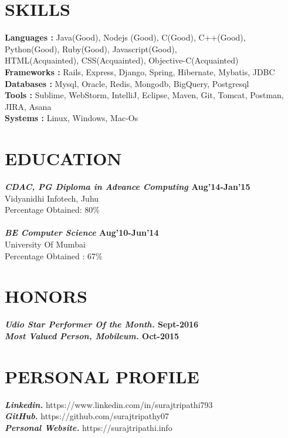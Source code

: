 \documentclass[line, margin]{res}
\begin{document}
\begin{resume}
\section{SKILLS} 
\textbf{Languages : }Java(Good), Nodejs (Good), C(Good), C++(Good), Python(Good), Ruby(Good), Javascript(Good), \\HTML(Acquainted), CSS(Acquainted), Objective-C(Acquainted) \\
\textbf{Frameworks : }Rails, Express, Django, Spring, Hibernate, Mybatis, JDBC \\
\textbf{Databases : }Mysql, Oracle, Redis, Mongodb, BigQuery, Postgresql \\
\textbf{Tools : }Sublime, WebStorm, IntelliJ, Eclipse, Maven, Git, Tomcat, Postman, JIRA, Asana \\
\textbf{Systems : }Linux, Windows, Mac-Os

\section{EDUCATION} 
\textbf{\textit{CDAC, PG Diploma in Advance Computing} \hfill Aug'14-Jan'15} \\
Vidyanidhi Infotech, Juhu \\
Percentage Obtained: 80\% \\
\\
\textbf{\textit{BE Computer Science} \hfill Aug'10-Jun'14} \\
University Of Mumbai \\
Percentage Obtained : 67\% \\
\section{HONORS}
\textbf{\textit{Udio Star Performer Of the Month.} \hfill Sept-2016} \\ 
\textbf{\textit{Most Valued Person, Mobileum.} \hfill Oct-2015} \\ 
\section{PERSONAL PROFILE}

\textbf{\textit{Linkedin.}} https://www.linkedin.com/in/surajtripathi793 \\
\textbf{\textit{GitHub.}} https://github.com/surajtripathy07  \\
\textbf{\textit{Personal Website.}} https://surajtripathi.info\\
\end{resume}
\end{document}
